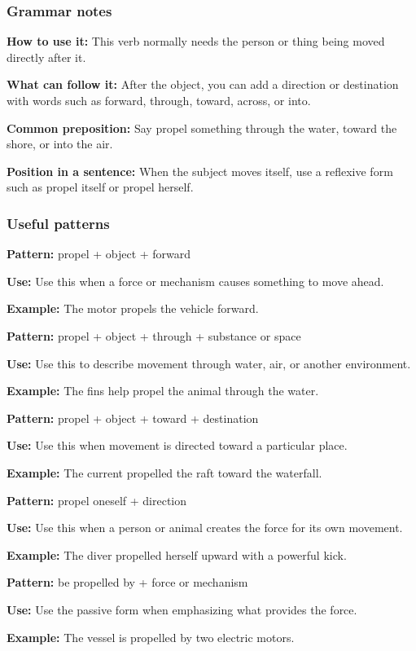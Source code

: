 \documentclass[11pt]{article}
\begin{document}
\subsubsection{Grammar notes}
\textbf{How to use it:} This verb normally needs the person or thing being moved directly after it.

\textbf{What can follow it:} After the object, you can add a direction or destination with words such as forward, through, toward, across, or into.

\textbf{Common preposition:} Say propel something through the water, toward the shore, or into the air.

\textbf{Position in a sentence:} When the subject moves itself, use a reflexive form such as propel itself or propel herself.

\subsubsection{Useful patterns}
\textbf{Pattern:} propel + object + forward

\textbf{Use:} Use this when a force or mechanism causes something to move ahead.

\textbf{Example:} The motor propels the vehicle forward.

\textbf{Pattern:} propel + object + through + substance or space

\textbf{Use:} Use this to describe movement through water, air, or another environment.

\textbf{Example:} The fins help propel the animal through the water.

\textbf{Pattern:} propel + object + toward + destination

\textbf{Use:} Use this when movement is directed toward a particular place.

\textbf{Example:} The current propelled the raft toward the waterfall.

\textbf{Pattern:} propel oneself + direction

\textbf{Use:} Use this when a person or animal creates the force for its own movement.

\textbf{Example:} The diver propelled herself upward with a powerful kick.

\textbf{Pattern:} be propelled by + force or mechanism

\textbf{Use:} Use the passive form when emphasizing what provides the force.

\textbf{Example:} The vessel is propelled by two electric motors.
\end{document}
